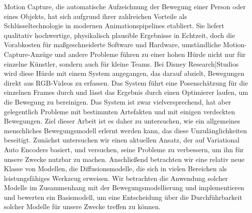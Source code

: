 Motion Capture, die automatische Aufzeichnung der Bewegung einer Person oder eines Objekts, hat sich aufgrund ihrer zahlreichen Vorteile als Schlüsseltechnologie in modernen Animationspipelines etabliert. Sie liefert qualitativ hochwertige, physikalisch plausible Ergebnisse in Echtzeit, doch die Vorabkosten für maßgeschneiderte Software und Hardware, umständliche Motion-Capture-Anzüge und andere Probleme führen zu einer hohen Hürde nicht nur für einzelne Künstler, sondern auch für kleine Teams. Bei Disney Research|Studios wird diese Hürde mit einem System angegangen, das darauf abzielt, Bewegungen direkt aus RGB-Videos zu erfassen. Das System führt eine Posenschätzung für die einzelnen Frames durch und lässt das Ergebnis durch einen Optimierer laufen, um die Bewegung zu bereinigen. Das System ist zwar vielversprechend, hat aber gelegentlich Probleme mit bestimmten Artefakten und mit einigen verdeckten Bewegungen. Ziel dieser Arbeit ist es daher zu untersuchen, wie ein allgemeines menschliches Bewegungsmodell erlernt werden kann, das diese Unzulänglichkeiten beseitigt. Zunächst untersuchen wir einen aktuellen Ansatz, der auf Variational Auto Encoders basiert, und versuchen, seine Probleme zu verbessern, um ihn für unsere Zwecke nutzbar zu machen. Anschließend betrachten wir eine relativ neue Klasse von Modellen, die Diffusionsmodelle, die sich in vielen Bereichen als leistungsfähiges Werkzeug erweisen. Wir betrachten die Anwendung solcher Modelle im Zusammenhang mit der Bewegungsmodellierung und implementieren und bewerten ein Basismodell, um eine Entscheidung über die Durchführbarkeit solcher Modelle für unsere Zwecke treffen zu können.